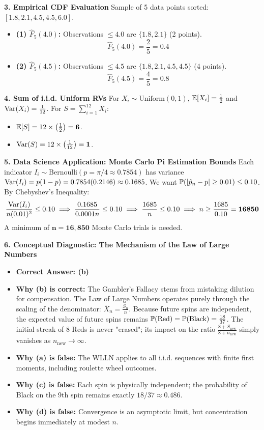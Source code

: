 \textbf{3. Empirical CDF Evaluation}
Sample of 5 data points sorted: $[1.8, 2.1, 4.5, 4.5, 6.0]$.
\begin{itemize}
    \item \textbf{(1) $\hat{F}_5(4.0)$:} Observations $\le 4.0$ are $\{1.8, 2.1\}$ (2 points).
    $$\hat{F}_5(4.0) = \frac{2}{5} = \mathbf{0.4}$$
    \item \textbf{(2) $\hat{F}_5(4.5)$:} Observations $\le 4.5$ are $\{1.8, 2.1, 4.5, 4.5\}$ (4 points).
    $$\hat{F}_5(4.5) = \frac{4}{5} = \mathbf{0.8}$$
\end{itemize}

\textbf{4. Sum of i.i.d. Uniform RVs}
For $X_i \sim \text{Uniform}(0, 1)$, $\E[X_i] = \frac{1}{2}$ and $\Var(X_i) = \frac{1}{12}$.
For $S = \sum_{i=1}^{12} X_i$:
\begin{itemize}
    \item $\E[S] = 12 \times \left(\frac{1}{2}\right) = \mathbf{6}$.
    \item $\Var(S) = 12 \times \left(\frac{1}{12}\right) = \mathbf{1}$.

\end{itemize}
\textbf{5. Data Science Application: Monte Carlo Pi Estimation Bounds}
Each indicator $I_i \sim \text{Bernoulli}(p = \pi/4 \approx 0.7854)$ has variance $\Var(I_i) = p(1-p) = 0.7854(0.2146) \approx 0.1685$.
We want $\P(|\hat{p}_n - p| \ge 0.01) \le 0.10$.
By Chebyshev's Inequality:
$$\frac{\Var(I_i)}{n (0.01)^2} \le 0.10 \implies \frac{0.1685}{0.0001 n} \le 0.10 \implies \frac{1685}{n} \le 0.10 \implies n \ge \frac{1685}{0.10} = \mathbf{16850}$$
A minimum of $\mathbf{n = 16,850}$ Monte Carlo trials is needed.

\textbf{6. Conceptual Diagnostic: The Mechanism of the Law of Large Numbers}
\begin{itemize}
    \item \textbf{Correct Answer: (b)}
    \item \textbf{Why (b) is correct:} The Gambler's Fallacy stems from mistaking dilution for compensation. The Law of Large Numbers operates purely through the scaling of the denominator: $\bar{X}_n = \frac{S_n}{n}$. Because future spins are independent, the expected value of future spins remains $\P(\text{Red}) = \P(\text{Black}) = \frac{18}{37}$. The initial streak of 8 Reds is never "erased"; its impact on the ratio $\frac{8 + S_{\text{new}}}{8 + n_{\text{new}}}$ simply vanishes as $n_{\text{new}} \to \infty$.
    \item \textbf{Why (a) is false:} The WLLN applies to all i.i.d. sequences with finite first moments, including roulette wheel outcomes.
    \item \textbf{Why (c) is false:} Each spin is physically independent; the probability of Black on the 9th spin remains exactly $18/37 \approx 0.486$.
    \item \textbf{Why (d) is false:} Convergence is an asymptotic limit, but concentration begins immediately at modest $n$.
\end{itemize}


